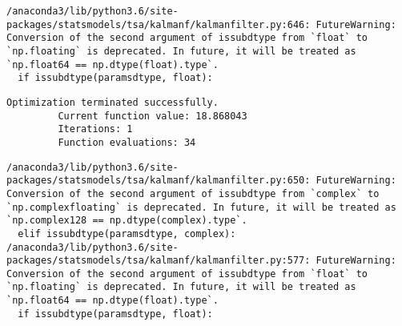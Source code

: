 \documentclass[11pt]{article}
\begin{document}
    \begin{Verbatim}[commandchars=\\\{\}]
/anaconda3/lib/python3.6/site-packages/statsmodels/tsa/kalmanf/kalmanfilter.py:646: FutureWarning: Conversion of the second argument of issubdtype from `float` to `np.floating` is deprecated. In future, it will be treated as `np.float64 == np.dtype(float).type`.
  if issubdtype(paramsdtype, float):

    \end{Verbatim}

    \begin{Verbatim}[commandchars=\\\{\}]
Optimization terminated successfully.
         Current function value: 18.868043
         Iterations: 1
         Function evaluations: 34

    \end{Verbatim}

    \begin{Verbatim}[commandchars=\\\{\}]
/anaconda3/lib/python3.6/site-packages/statsmodels/tsa/kalmanf/kalmanfilter.py:650: FutureWarning: Conversion of the second argument of issubdtype from `complex` to `np.complexfloating` is deprecated. In future, it will be treated as `np.complex128 == np.dtype(complex).type`.
  elif issubdtype(paramsdtype, complex):
/anaconda3/lib/python3.6/site-packages/statsmodels/tsa/kalmanf/kalmanfilter.py:577: FutureWarning: Conversion of the second argument of issubdtype from `float` to `np.floating` is deprecated. In future, it will be treated as `np.float64 == np.dtype(float).type`.
  if issubdtype(paramsdtype, float):

    \end{Verbatim}
\end{document}
